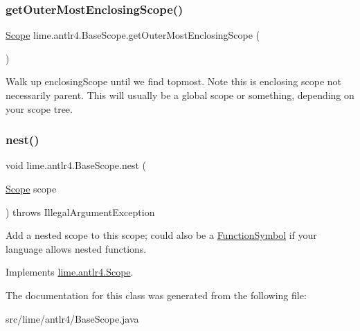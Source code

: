 \subsubsection{\texorpdfstring{get\+Outer\+Most\+Enclosing\+Scope()}{getOuterMostEnclosingScope()}}
{\footnotesize\ttfamily \hyperlink{interfacelime_1_1antlr4_1_1Scope}{Scope} lime.\+antlr4.\+Base\+Scope.\+get\+Outer\+Most\+Enclosing\+Scope (\begin{DoxyParamCaption}{ }\end{DoxyParamCaption})}

Walk up enclosing\+Scope until we find topmost. Note this is enclosing scope not necessarily parent. This will usually be a global scope or something, depending on your scope tree. \mbox{\label{classlime_1_1antlr4_1_1BaseScope_abef111b3380ebe06ea7ee7f160dae1d5}} 
\subsubsection{\texorpdfstring{nest()}{nest()}}
{\footnotesize\ttfamily void lime.\+antlr4.\+Base\+Scope.\+nest (\begin{DoxyParamCaption}\item[{\hyperlink{interfacelime_1_1antlr4_1_1Scope}{Scope}}]{scope }\end{DoxyParamCaption}) throws Illegal\+Argument\+Exception}

Add a nested scope to this scope; could also be a \hyperlink{classlime_1_1antlr4_1_1FunctionSymbol}{Function\+Symbol} if your language allows nested functions. 

Implements \hyperlink{interfacelime_1_1antlr4_1_1Scope}{lime.\+antlr4.\+Scope}.



The documentation for this class was generated from the following file\+:\begin{DoxyCompactItemize}
\item 
src/lime/antlr4/Base\+Scope.\+java\end{DoxyCompactItemize}
